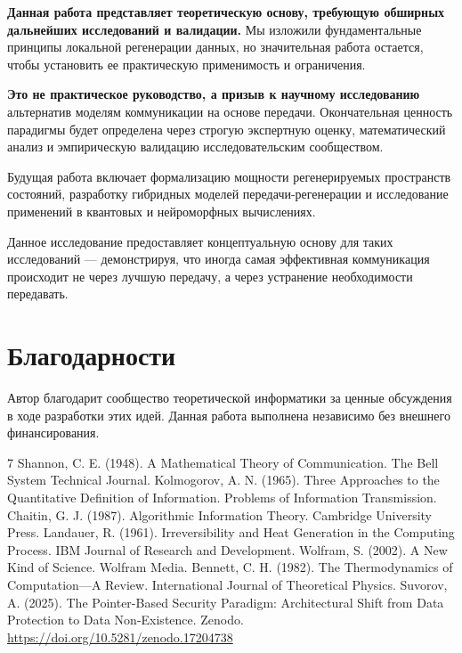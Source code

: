 \documentclass[11pt,a4paper]{article}
\begin{document}
\textbf{Данная работа представляет теоретическую основу, требующую обширных дальнейших исследований и валидации.} Мы изложили фундаментальные принципы локальной регенерации данных, но значительная работа остается, чтобы установить ее практическую применимость и ограничения.

\textbf{Это не практическое руководство, а призыв к научному исследованию} альтернатив моделям коммуникации на основе передачи. Окончательная ценность парадигмы будет определена через строгую экспертную оценку, математический анализ и эмпирическую валидацию исследовательским сообществом.

Будущая работа включает формализацию мощности регенерируемых пространств состояний, разработку гибридных моделей передачи-регенерации и исследование применений в квантовых и нейроморфных вычислениях.

Данное исследование предоставляет концептуальную основу для таких исследований — демонстрируя, что иногда самая эффективная коммуникация происходит не через лучшую передачу, а через устранение необходимости передавать.

\section*{Благодарности}

Автор благодарит сообщество теоретической информатики за ценные обсуждения в ходе разработки этих идей. Данная работа выполнена независимо без внешнего финансирования.

\begin{thebibliography}{7}
 Shannon, C. E. (1948). A Mathematical Theory of Communication. The Bell System Technical Journal.
 Kolmogorov, A. N. (1965). Three Approaches to the Quantitative Definition of Information. Problems of Information Transmission.
 Chaitin, G. J. (1987). Algorithmic Information Theory. Cambridge University Press.
 Landauer, R. (1961). Irreversibility and Heat Generation in the Computing Process. IBM Journal of Research and Development.
 Wolfram, S. (2002). A New Kind of Science. Wolfram Media.
 Bennett, C. H. (1982). The Thermodynamics of Computation—A Review. International Journal of Theoretical Physics.
 Suvorov, A. (2025). The Pointer-Based Security Paradigm: Architectural Shift from Data Protection to Data Non-Existence. Zenodo. \url{https://doi.org/10.5281/zenodo.17204738}
\end{thebibliography}
\end{document}
